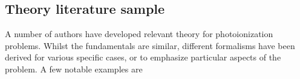 \subsection{Theory literature sample\label{sec:theory-lit}}

A number of authors have developed relevant theory for photoionization problems. Whilst the fundamentals are similar, different formalisms have been derived for various specific cases, or to emphasize particular aspects of the problem. A few notable examples are 